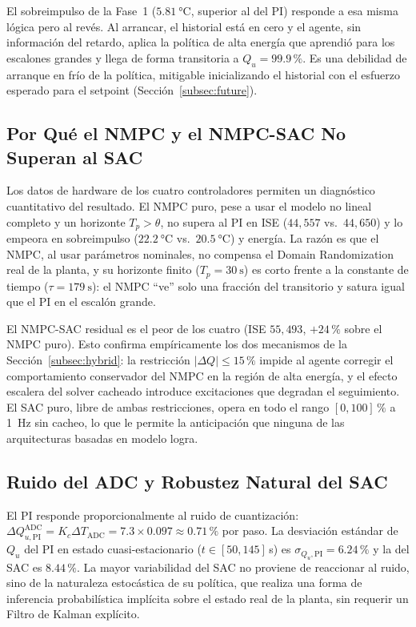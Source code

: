 \documentclass[processes,article,submit,moreauthors,pdftex]{Definitions/mdpi}
\newcommand{\Qu}{Q_u}
\begin{document}
El sobreimpulso de la Fase~1 ($\SI{5.81}{\celsius}$, superior al del PI)
responde a esa misma lógica pero al revés. Al arrancar, el historial está en
cero y el agente, sin información del retardo, aplica la política de alta
energía que aprendió para los escalones grandes y llega de forma transitoria
a $\Qu = 99.9\,\%$. Es una debilidad de arranque en frío de
la política, mitigable inicializando el historial con el esfuerzo esperado
para el setpoint (Sección~\ref{subsec:future}).

\subsection{Por Qué el NMPC y el NMPC-SAC No Superan al SAC}
\label{subsec:disc_nmpc}

Los datos de hardware de los cuatro controladores permiten un diagnóstico
cuantitativo del resultado. El NMPC puro, pese a usar el
modelo no lineal completo y un horizonte $T_p > \theta$, no supera al PI en
ISE ($44{,}557$ vs.\ $44{,}650$) y lo empeora en sobreimpulso
($\SI{22.2}{\celsius}$ vs.\ $\SI{20.5}{\celsius}$) y energía. La razón es
que el NMPC, al usar parámetros nominales, no compensa el Domain
Randomization real de la planta, y su horizonte finito ($T_p =
\SI{30}{\second}$) es corto frente a la constante de tiempo
($\tau = \SI{179}{\second}$): el NMPC ``ve'' solo una fracción del transitorio
y satura igual que el PI en el escalón grande.

El NMPC-SAC residual es el peor de los cuatro (ISE $55{,}493$,
$+24\,\%$ sobre el NMPC puro). Esto confirma empíricamente los dos
mecanismos de la Sección~\ref{subsec:hybrid}: la restricción
$|\Delta Q| \leq 15\,\%$ impide al agente corregir el comportamiento
conservador del NMPC en la región de alta energía, y el efecto escalera del
solver cacheado introduce excitaciones que degradan el seguimiento. El SAC
puro, libre de ambas restricciones, opera en todo el rango $[0,100]\,\%$ a
\SI{1}{\hertz} sin cacheo, lo que le permite la anticipación que ninguna de
las arquitecturas basadas en modelo logra.

\subsection{Ruido del ADC y Robustez Natural del SAC}
\label{subsec:disc_adc}

El PI responde proporcionalmente al ruido de cuantización:
$\Delta Q_{u,\mathrm{PI}}^{\mathrm{ADC}} = K_c \Delta T_{\mathrm{ADC}} =
7.3 \times 0.097 \approx 0.71\,\%$ por paso. La desviación estándar de
$\Qu$ del PI en estado cuasi-estacionario ($t \in [50,145]$\,s) es
$\sigma_{\Qu,\mathrm{PI}} = 6.24\,\%$ y la del SAC es $8.44\,\%$. La mayor
variabilidad del SAC no proviene de reaccionar al ruido, sino de la
naturaleza estocástica de su política, que realiza una forma de inferencia
probabilística implícita sobre el estado real de la planta, sin requerir un
Filtro de Kalman explícito.
\end{document}
